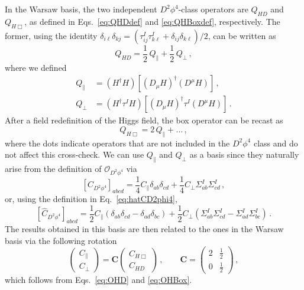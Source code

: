 In the Warsaw basis, the two independent $D^2\phi^4$-class operators are $Q_{HD}$ and $Q_{H\Box}$, as defined in Eqs.~\eqref{eq:QHDdef} and \eqref{eq:QHBoxdef}, respectively.
The former, using the identity $\delta_{i\ell}\delta_{kj}=(\tau^I_{ij}\tau^I_{k\ell}+\delta_{ij}\delta_{k\ell})/2$, can be written as
\begin{equation}\label{eq:OHD}
    Q_{HD} = \frac{1}{2}\,Q_\parallel+\frac{1}{2}\,Q_\perp\,,
\end{equation}
where we defined
\begin{align}
    Q_\parallel &= (H^\dagger H)[(D_\mu H)^\dagger (D^\mu H)] \,,
    \\
    Q_\perp &= (H^\dagger \tau^I H)[(D_\mu H)^\dagger \tau^I (D^\mu H)]\,.
\end{align}
After a field redefinition of the Higgs field, the box operator can be recast as
\begin{equation}\label{eq:OHBox}
    Q_{H\Box} = 2\, Q_\parallel + \dotsc\,,
\end{equation}
where the dots indicate operators that are not included in the $D^2\phi^4$ class and do not affect this cross-check. 
We can use $Q_\parallel$ and $Q_\perp$ as a basis since they naturally arise from the definition of $\mathcal O_{D^2\phi^4}$ via
\begin{equation}
    \left[C_{D^2\phi^4}\right]_{abcd} = \frac{1}{4}C_\parallel \delta_{ab}\delta_{cd}+\frac{1}{4}C_\perp \Sigma^I_{ab}\Sigma^I_{cd}\,,
\end{equation}
or, using the definition in Eq.~\eqref{eq:hatCD2phi4}, 
\begin{equation}
    \left[\widehat C_{D^2\phi^4}\right]_{abcd} = \frac{1}{2}C_\parallel\left( \delta_{ab}\delta_{cd}-\delta_{ad}\delta_{bc}\right)+\frac{1}{2}C_\perp \left( \Sigma^I_{ab}\Sigma^I_{cd}-\Sigma^I_{ad}\Sigma^I_{bc}\right)\,.
\end{equation}
The results obtained in this basis are then related to the ones in the Warsaw basis via the following rotation
\begin{equation}
    \begin{pmatrix}
    C_\parallel \\ C_\perp
\end{pmatrix} = \mathbf{C} \begin{pmatrix}
    C_{H\Box} \\ C_{HD}
\end{pmatrix}\,, \qquad
\mathbf{C}=\begin{pmatrix}
    2 & \frac{1}{2} \\ 0 & \frac{1}{2}
\end{pmatrix}\,,
\end{equation}
which follows from Eqs.~\eqref{eq:OHD} and \eqref{eq:OHBox}. 

